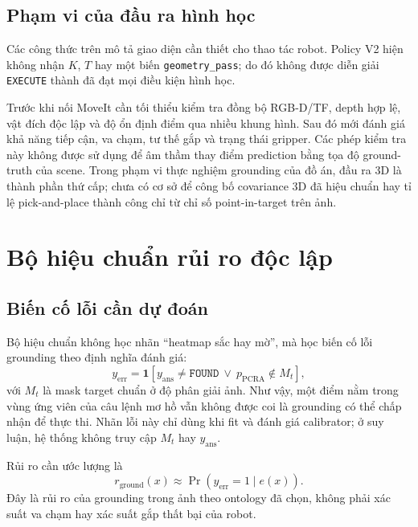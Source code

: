 \subsection{Phạm vi của đầu ra hình học}

Các công thức trên mô tả giao diện cần thiết cho thao tác robot.
Policy V2 hiện không nhận $K$, $T$ hay một biến
\texttt{geometry\_pass}; do đó không được diễn giải
\texttt{EXECUTE} thành đã đạt mọi điều kiện hình học.

Trước khi nối MoveIt cần tối thiểu kiểm tra đồng bộ RGB-D/TF,
depth hợp lệ, vật đích độc lập và độ ổn định điểm qua nhiều
khung hình. Sau đó mới đánh giá khả năng tiếp cận, va chạm,
tư thế gắp và trạng thái gripper. Các phép kiểm tra này không
được sử dụng để âm thầm thay điểm prediction bằng tọa độ
ground-truth của scene.
Trong phạm vi thực nghiệm grounding của đồ án, đầu ra 3D là
thành phần thứ cấp; chưa có cơ sở để công bố covariance 3D
đã hiệu chuẩn hay tỉ lệ pick-and-place thành công chỉ từ chỉ
số point-in-target trên ảnh.

\section{Bộ hiệu chuẩn rủi ro độc lập}
\label{sec:method-calibrator}

\subsection{Biến cố lỗi cần dự đoán}

Bộ hiệu chuẩn không học nhãn “heatmap sắc hay mờ”, mà học biến cố
lỗi grounding theo định nghĩa đánh giá:
\begin{equation}
    y_{\mathrm{err}}=
    \mathbf{1}\left[
    y_{\mathrm{ans}}\neq\texttt{FOUND}
    \ \lor\ p_{\mathrm{PCRA}}\notin M_t
    \right],
    \label{eq:method-error-event}
\end{equation}
với $M_t$ là mask target chuẩn ở độ phân giải ảnh.
Như vậy, một điểm nằm trong vùng ứng viên của câu lệnh mơ hồ vẫn
không được coi là grounding có thể chấp nhận để thực thi.
Nhãn lỗi này chỉ dùng khi fit và đánh giá calibrator;
ở suy luận, hệ thống không truy cập $M_t$ hay $y_{\mathrm{ans}}$.

Rủi ro cần ước lượng là
\begin{equation}
    r_{\mathrm{ground}}(x)
    \approx \Pr(y_{\mathrm{err}}=1\mid e(x)).
\end{equation}
Đây là rủi ro của grounding trong ảnh theo ontology đã chọn,
không phải xác suất va chạm hay xác suất gắp thất bại của robot.

